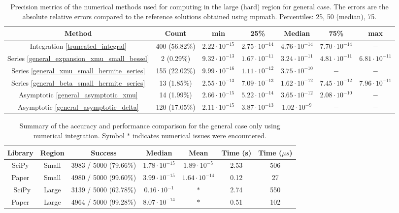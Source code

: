 \documentclass[10pt,a4paper,oneside]{article}
\numberwithin{equation}{section}
\begin{document}
\begin{table}[htbp]
\centering
\scalebox{0.9}
{
\begin{tabular}{ccccccc}
\hline
Method & Count & min & 25\% & Median & 75\% & max\\
\hline
Integration \eqref{truncated_integral} & 400 (56.82\%) & $2.22\cdot 10^{-15}$ & $2.75\cdot 10^{-14}$ & $4.76\cdot 10^{-14}$ & $7.70\cdot 10^{-14}$ & $-$ \\
Series \eqref{general_expansion_xmu_small_bessel} & 2 (0.29\%) & $9.32\cdot 10^{-13}$ & $1.67\cdot 10^{-11}$ & $3.24\cdot 10^{-11}$ & $4.81\cdot 10^{-11}$ & $6.81\cdot 10^{-11}$\\
Series \eqref{general_xmu_small_hermite_series} & 155 (22.02\%) & $9.99\cdot 10^{-16}$ & $1.11\cdot 10^{-12}$ & $3.75\cdot 10^{-10}$ & $-$ & $-$\\
Series \eqref{general_beta_small_hermite_series} & 13 (1.85\%) & $2.55\cdot 10^{-13}$ & $7.09\cdot 10^{-13}$ & $1.62\cdot 10^{-12}$ & $7.45\cdot 10^{-12}$ & $7.96\cdot 10^{-11}$\\
Asymptotic \eqref{general_asymptotic_xmu} & 14 (1.99\%) & $2.66\cdot 10^{-15}$ & $5.22\cdot 10^{-14}$ & $3.65\cdot 10^{-12}$ & $2.08\cdot 10^{-10}$ & $-$\\
Asymptotic \eqref{general_asymptotic_delta} & 120 (17.05\%) & $2.11\cdot 10^{-15}$ & $3.87\cdot 10^{-13}$ & $1.02\cdot 10^{-9}$ & $-$ & $-$\\
	\hline
\end{tabular}
}
	\caption{Precision metrics of the numerical methods used for computing in the large (hard) region for general case. The errors are the absolute relative errors compared to the reference solutions obtained using mpmath. Percentiles: 25, 50 (median), 75.}
	\label{table_methods_case_general_large_hard}
\end{table}

\begin{table}[htbp]
\centering
\scalebox{0.9}
{
\begin{tabular}{ccccc|cc}
\hline
Library & Region & Success & Median & Mean & Time (s) & Time ($\mu s$)\\
\hline
SciPy & Small & 3983 / 5000 (79.66\%) &  $1.78\cdot 10^{-15}$ & $1.89 \cdot 10^{-5}$ & 2.53 & 506\\
Paper & Small & 4980 / 5000 (99.60\%) & $3.99\cdot 10^{-15}$ & $1.64\cdot 10^{-14}$ & 0.12 & 27\\
	\hline\
SciPy & Large & 3139 / 5000 (62.78\%) & $0.16\cdot 10^{-1}$ & $*$ & 2.74 & 550\\
Paper & Large & 4964 / 5000 (99.28\%) & $8.07\cdot 10^{-14}$ & $*$ & 0.51 & 102\\
	\hline
\end{tabular}}
	\caption{Summary of the accuracy and performance comparison for the general case only using numerical integration. Symbol $*$ indicates numerical issues were encountered.}
	\label{table_comparison_case_general_integration}
\end{table}
\end{document}
